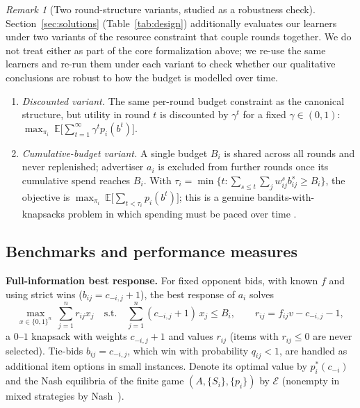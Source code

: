\documentclass{article}
\theoremstyle{definition}
\theoremstyle{remark}
\newtheorem{remark}{Remark}
\newcommand{\E}{\mathbb{E}}
\begin{document}
\begin{remark}[Two round-structure variants, studied as a robustness check]
\label{rem:roundvariants}
Section~\ref{sec:solutions} (Table~\ref{tab:design}) additionally evaluates our
learners under two variants of the resource constraint that couple rounds together.
We do not treat either as part of the core formalization above; we re-use the same
learners and re-run them under each variant to check whether our qualitative
conclusions are robust to how the budget is modelled over time.
\begin{enumerate}[leftmargin=*]
  \item \emph{Discounted variant.} The same per-round budget constraint as the
  canonical structure, but utility in round $t$ is discounted by $\gamma^t$ for a
  fixed $\gamma\in(0,1)$: $\max_{\pi_i}\ \E\big[\sum_{t=1}^\infty \gamma^t p_i(b^t)\big]$.
  \item \emph{Cumulative-budget variant.} A single budget $B_i$ is shared across all
  rounds and never replenished; advertiser $a_i$ is excluded from further rounds
  once its cumulative spend reaches $B_i$. With
  $\tau_i=\min\{t:\sum_{s\le t}\sum_j w^s_{ij}b^s_{ij}\ge B_i\}$, the objective is
  $\max_{\pi_i}\ \E\big[\sum_{t<\tau_i}p_i(b^t)\big]$; this is a genuine
  bandits-with-knapsacks problem in which spending must be paced over time
  \citep{badanidiyuru2013bandits}.
\end{enumerate}
\end{remark}

\subsection{Benchmarks and performance measures}
\textbf{Full-information best response.} For fixed opponent bids, with known $f$ and using strict wins ($b_{ij}=c_{-i,j}+1$), the best response of $a_i$ solves
\begin{equation}\label{eq:knap}
\max_{x\in\{0,1\}^n}\ \sum_{j=1}^n r_{ij}x_j\quad\text{s.t.}\quad\sum_{j=1}^n(c_{-i,j}+1)\,x_j\le B_i,\qquad r_{ij}=f_{ij}v-c_{-i,j}-1,
\end{equation}
a $0$--$1$ knapsack with weights $c_{-i,j}+1$ and values $r_{ij}$ (items with $r_{ij}\le0$ are never selected). Tie-bids $b_{ij}=c_{-i,j}$, which win with probability $q_{ij}<1$, are handled as additional item options in small instances. Denote its optimal value by $p_i^\ast(c_{-i})$ and the Nash equilibria of the finite game $(A,\{S_i\},\{p_i\})$ by $\mathcal{E}$ (nonempty in mixed strategies by Nash~\cite{nash1951noncooperative}).
\end{document}
